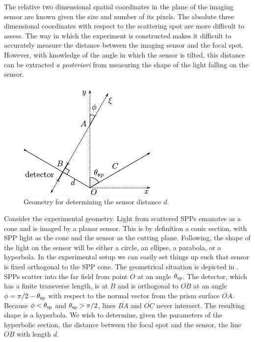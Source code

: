 The relative two dimensional spatial coordinates in the plane of the
imaging sensor are known given the size and number of its pixels.  The
absolute three dimensional coordinates with respect to the scattering spot
are more difficult to assess.  The way in which the experiment is
constructed makes it difficult to accurately measure the distance between
the imaging sensor and the focal spot.  However, with knowledge of the
angle in which the sensor is tilted, this distance can be extracted
\textit{a posteriori} from measuring the shape of the light falling on the
sensor.
\begin{figure}[ht]
\centering
\includegraphics[keepaspectratio,scale=1.25]{figures/hyperbolageoa.pdf}
\caption{Geometry for determining the sensor distance $d$.}
\label{fig:propgeo}
\end{figure}

Consider the experimental geometry.  Light from scattered SPPs emanates as
a cone and is imaged by a planar sensor.  This is by definition a conic
section, with SPP light as the cone and the sensor as the cutting
plane.  Following, the shape of the light on the sensor will be either a
circle, an ellipse, a parabola, or a hyperbola.  In the experimental setup
we can easily set things up such that sensor is fixed
orthogonal to the SPP cone.  The geometrical situation is depicted in
.  SPPs scatter into the far field from point $O$ at an
angle $\theta_\mathrm{sp}$.  The detector, which has a finite transverse length, is at $B$ and is
orthogonal to $\overline{OB}$ at an angle $\phi=\pi/2-\theta_\mathrm{sp}$ with respect to
the normal vector from the prism surface $\overline{OA}$.  Because
$\phi<\theta_\mathrm{sp}$ and $\theta_\mathrm{sp}>\pi/2$, lines $\overline{BA}$ and $\overline{OC}$ never
intersect. The resulting shape is a hyperbola.  We wish to determine, given
the parameters of the hyperbolic section, the distance between the focal
spot and the sensor, the line $\overline{OB}$ with length $d$.  

